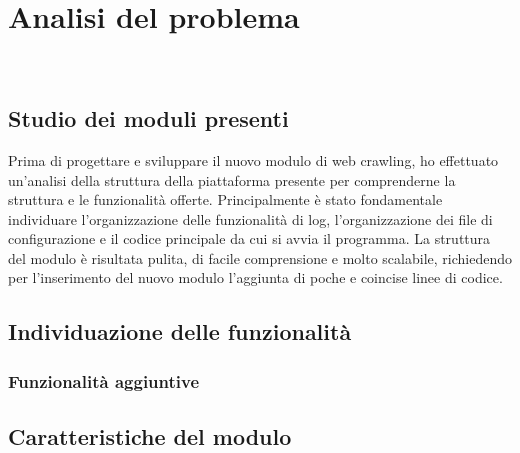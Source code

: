
\chapter{Analisi del problema}
\label{cap:analisi-del-problema}

\\

\section{Studio dei moduli presenti}

Prima di progettare e sviluppare il nuovo modulo di web crawling, ho effettuato un’analisi della struttura della piattaforma presente per comprenderne la struttura e le funzionalità offerte. Principalmente è stato fondamentale individuare l'organizzazione delle funzionalità di log, l'organizzazione dei file di configurazione e il codice principale da cui si avvia il programma. La struttura del modulo è risultata pulita, di facile comprensione e molto scalabile, richiedendo per l'inserimento del nuovo modulo l'aggiunta di poche e coincise linee di codice.

\section{Individuazione delle funzionalità}



\subsection{Funzionalità aggiuntive}

\section{Caratteristiche del modulo}
